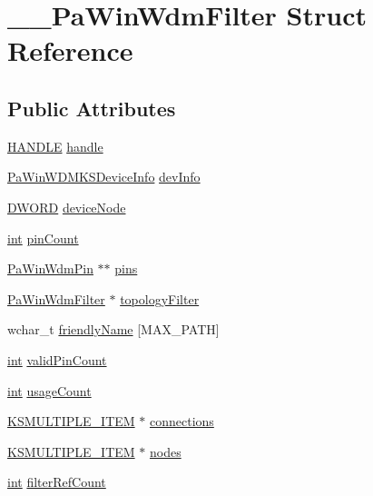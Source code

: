 \hypertarget{struct_____pa_win_wdm_filter}{}\section{\+\_\+\+\_\+\+Pa\+Win\+Wdm\+Filter Struct Reference}
\label{struct_____pa_win_wdm_filter}
\subsection*{Public Attributes}
\begin{DoxyCompactItemize}
\item 
\hyperlink{_sound_touch_d_l_l_8h_aa8c0374618b33785ccb02f74bcfebc46}{H\+A\+N\+D\+LE} \hyperlink{struct_____pa_win_wdm_filter_a86cd1691cdf7957417f949b54b122201}{handle}
\item 
\hyperlink{struct_pa_win_w_d_m_k_s_device_info}{Pa\+Win\+W\+D\+M\+K\+S\+Device\+Info} \hyperlink{struct_____pa_win_wdm_filter_a038e392b8dc260bd959dc1d9eaaa6a32}{dev\+Info}
\item 
\hyperlink{mapinls_8h_ad342ac907eb044443153a22f964bf0af}{D\+W\+O\+RD} \hyperlink{struct_____pa_win_wdm_filter_a105c3a8f9cc3b7be4c7c0441c02dfa88}{device\+Node}
\item 
\hyperlink{xmltok_8h_a5a0d4a5641ce434f1d23533f2b2e6653}{int} \hyperlink{struct_____pa_win_wdm_filter_afd1955556211487bb56538d548778e23}{pin\+Count}
\item 
\hyperlink{pa__win__wdmks_8c_a1b9a07297c7f8093f59fc4b333c9ba68}{Pa\+Win\+Wdm\+Pin} $\ast$$\ast$ \hyperlink{struct_____pa_win_wdm_filter_abe74b1bbe62a54025b7c05bd8519d19f}{pins}
\item 
\hyperlink{pa__win__wdmks_8c_add25dc7e76c77419d4520c774371efe4}{Pa\+Win\+Wdm\+Filter} $\ast$ \hyperlink{struct_____pa_win_wdm_filter_aa0e3f96e187199b62f9c5bfd500cf3e7}{topology\+Filter}
\item 
wchar\+\_\+t \hyperlink{struct_____pa_win_wdm_filter_ad1b53f3170d7cb538e61642f3321ad81}{friendly\+Name} \mbox{[}M\+A\+X\+\_\+\+P\+A\+TH\mbox{]}
\item 
\hyperlink{xmltok_8h_a5a0d4a5641ce434f1d23533f2b2e6653}{int} \hyperlink{struct_____pa_win_wdm_filter_a5c441f64352697c820c2b296979e984b}{valid\+Pin\+Count}
\item 
\hyperlink{xmltok_8h_a5a0d4a5641ce434f1d23533f2b2e6653}{int} \hyperlink{struct_____pa_win_wdm_filter_a044b9a83d9af60246e4f1696182ef1b8}{usage\+Count}
\item 
\hyperlink{struct_k_s_m_u_l_t_i_p_l_e___i_t_e_m}{K\+S\+M\+U\+L\+T\+I\+P\+L\+E\+\_\+\+I\+T\+EM} $\ast$ \hyperlink{struct_____pa_win_wdm_filter_acb2256419c942e072c17068bbe5dca8f}{connections}
\item 
\hyperlink{struct_k_s_m_u_l_t_i_p_l_e___i_t_e_m}{K\+S\+M\+U\+L\+T\+I\+P\+L\+E\+\_\+\+I\+T\+EM} $\ast$ \hyperlink{struct_____pa_win_wdm_filter_a5e676e26c0e890e93bf501853e9b91fe}{nodes}
\item 
\hyperlink{xmltok_8h_a5a0d4a5641ce434f1d23533f2b2e6653}{int} \hyperlink{struct_____pa_win_wdm_filter_a7d9dcc84bbd2a8220c4e4ed6dae36181}{filter\+Ref\+Count}
\end{DoxyCompactItemize}


